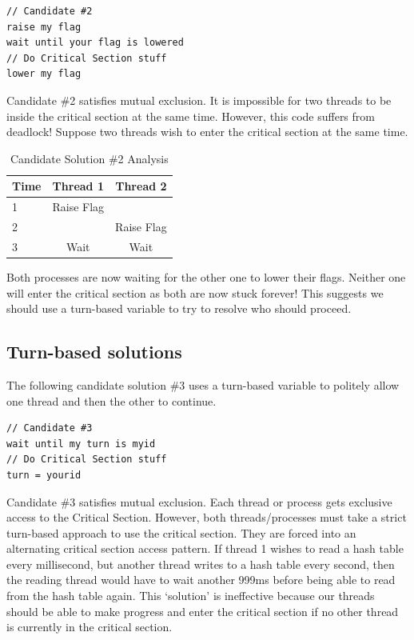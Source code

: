 \begin{lstlisting}
// Candidate #2
raise my flag
wait until your flag is lowered
// Do Critical Section stuff
lower my flag
\end{lstlisting}

Candidate \#2 satisfies mutual exclusion.
It is impossible for two threads to be inside the critical section at the same time.
However, this code suffers from deadlock!
Suppose two threads wish to enter the critical section at the same time.

\begin{center}
\begin{table}[h]
\caption{Candidate Solution \#2 Analysis}
\begin{tabular}{|l|c|c|}
Time & Thread 1 & Thread 2 \\ \hline
1 & Raise Flag & \\
2 & & Raise Flag \\
3 & Wait & Wait \\
\end{tabular}
\end{table}
\end{center}

Both processes are now waiting for the other one to lower their flags.
Neither one will enter the critical section as both are now stuck forever!
This suggests we should use a turn-based variable to try to resolve who should proceed.

\subsection{Turn-based solutions}

The following candidate solution \#3 uses a turn-based variable to politely allow one thread and then the other to continue.

\begin{lstlisting}
// Candidate #3
wait until my turn is myid
// Do Critical Section stuff
turn = yourid
\end{lstlisting}

Candidate \#3 satisfies mutual exclusion.
Each thread or process gets exclusive access to the Critical Section.
However, both threads/processes must take a strict turn-based approach to use the critical section.
They are forced into an alternating critical section access pattern.
If thread 1 wishes to read a hash table every millisecond, but another thread writes to a hash table every second, then the reading thread would have to wait another 999ms before being able to read from the hash table again.
This `solution' is ineffective because our threads should be able to make progress and enter the critical section if no other thread is currently in the critical section.

